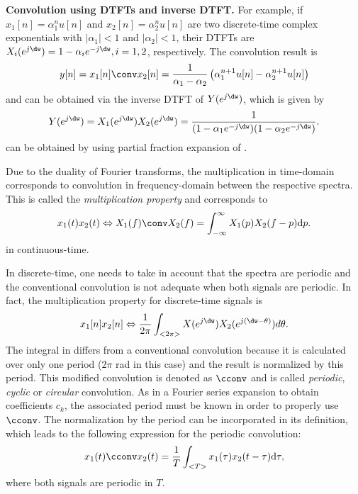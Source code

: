\bExample \textbf{Convolution using DTFTs and inverse DTFT.}
For example, if $x_1[n]=\alpha_1^n u[n]$ and $x_2[n]=\alpha_2^n u[n]$ are two discrete-time complex exponentials with $|\alpha_1|<1$ and $|\alpha_2|<1$, their DTFTs are $X_i(e^{j \dw})=1-\alpha_ie^{-j \dw},i=1,2$, respectively. The convolution result is
\begin{equation}
y[n] = x_1[n] \conv x_2[n]  = \frac{1}{\alpha_1 - \alpha_2} \left( \alpha_1^{n+1} u[n] - \alpha_2^{n+1} u[n]\right)
\label{eq:convolutionExampleDTFT}
\end{equation}
and can be obtained via the inverse DTFT of $Y(e^{j \dw})$, which is given by
\begin{equation}
Y(e^{j \dw}) = X_1(e^{j \dw}) X_2(e^{j \dw}) = \frac{1}{(1-\alpha_1e^{-j \dw})(1-\alpha_2e^{-j \dw})}.
\label{eq:convolutionExampleDTFT2}
\end{equation}
 can be obtained by using partial fraction expansion of .
\eExample

Due to the duality of Fourier transforms, the multiplication in time-domain corresponds
to convolution in frequency-domain between the respective spectra. This is called the
\emph{multiplication property} and corresponds to
\begin{equation}
x_1(t) x_2(t) \Leftrightarrow X_1(f) \conv X_2(f) = \int_{-\infty}^{\infty} X_1(p) X_2(f-p) \textrm{d}p.
\end{equation}
in continuous-time.

In discrete-time, one needs to take in account that the spectra are periodic and the conventional convolution is not adequate when both signals are periodic. In fact, the
multiplication property for discrete-time signals is
\begin{equation}
x_1[n]  x_2[n] \Leftrightarrow \frac{1}{2\pi} \int_{<2\pi>} X(e^{j \dw})  X_2(e^{j (\dw-\theta)}) d\theta.
\label{eq:windowingConvolution}
\end{equation}
The integral in  differs from a conventional convolution because it is calculated over only one period ($2 \pi$ rad in this case) and the result is normalized by this period. This modified convolution is denoted as $\cconv$ and
is called \emph{periodic}, \emph{cyclic} or \emph{circular} convolution. As in a Fourier series expansion to obtain coefficients $c_k$, the associated period must be known in order to properly use $\cconv$. The normalization by the period can be incorporated in its definition, which leads to the following expression for the periodic convolution:
\begin{equation}
x_1(t) \cconv x_2(t) = \frac{1}{T} \int_{<T>} x_1(\tau)  x_2(t-\tau) \textrm{d}\tau,
\label{eq:circularConvolution}
\end{equation}
where both signals are periodic in $T$.

